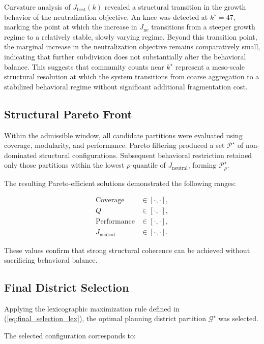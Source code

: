 \documentclass[conference]{IEEEtran}
\begin{document}
Curvature analysis of $J_{\text{best}}(k)$ revealed a structural transition
in the growth behavior of the neutralization objective. An knee was detected
at $k^\star = 47$, marking the point at which the increase in
$J_{\mathrm{ne}}$ transitions from a steeper growth regime
to a relatively stable, slowly varying regime.
Beyond this transition point, the marginal increase in the neutralization
objective remains comparatively small, indicating that further subdivision
does not substantially alter the behavioral balance. This suggests that
community counts near $k^\star$ represent a meso-scale structural resolution
at which the system transitions from coarse aggregation to a stabilized
behavioral regime without significant additional fragmentation cost.
\subsection{Structural Pareto Front}

Within the admissible window, all candidate partitions were evaluated 
using coverage, modularity, and performance. Pareto filtering produced a 
set $\mathcal{P}^\star$ of non-dominated structural configurations. 
Subsequent behavioral restriction retained only those partitions within 
the lowest $\rho$-quantile of $J_{\text{neutral}}$, forming 
$\mathcal{P}^\star_\rho$.

The resulting Pareto-efficient solutions demonstrated the following ranges:

\begin{align}
\mathrm{Coverage} &\in [\cdot,\cdot], \\
Q &\in [\cdot,\cdot], \\
\mathrm{Performance} &\in [\cdot,\cdot], \\
J_{\text{neutral}} &\in [\cdot,\cdot].
\end{align}

These values confirm that strong structural coherence can be achieved 
without sacrificing behavioral balance.

\subsection{Final District Selection}

Applying the lexicographic maximization rule defined in 
(\ref{eq:final_selection_lex}), the optimal planning district partition 
$\mathcal{G}^\star$ was selected.

The selected configuration corresponds to:
\end{document}
